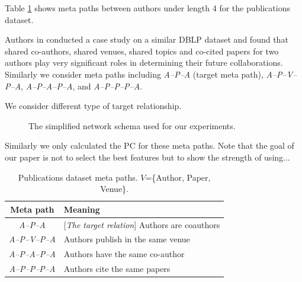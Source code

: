 Table \ref{table_publications} shows meta paths between authors under length 4 for the publications dataset.


Authors in \cite{sun2011ASONAM} conducted a case study on a similar DBLP dataset and found that shared co-authors, shared venues, shared topics and co-cited papers for two authors play very significant roles in determining their future collaborations. Similarly we consider meta paths including \textit{A--P--A} (target meta path), \textit{A--P--V--P--A}, \textit{A--P--A--P--A}, and \textit{A--P--P--P--A}.

We consider different type of target relationship.


\begin{figure}[t]
\centering
{}
\caption{The simplified network schema used for our experiments.} \label{Fig:expSchema}
\end{figure}


Similarly we only calculated the PC for these meta paths. Note that the goal of our paper is not to select the best features but to show the strength of using...


\begin{table}[h]
\centering
\caption{Publications dataset meta paths. $V$=\{Author, Paper, Venue\}.}
\label{table_publications}\scriptsize
\begin{tabular}{|c|l|} \hline
\textbf{Meta path} & \textbf{Meaning} \\ \hline

\textit{A--P--A} & [\textit{The target relation}] Authors are coauthors \\ \hline
\textit{A--P--V--P--A} & Authors publish in the same venue \\ \hline
\textit{A--P--A--P--A} & Authors have the same co-author \\ \hline
\textit{A--P--P--P--A} & Authors cite the same papers \\ \hline

\end{tabular}


\end{table}

